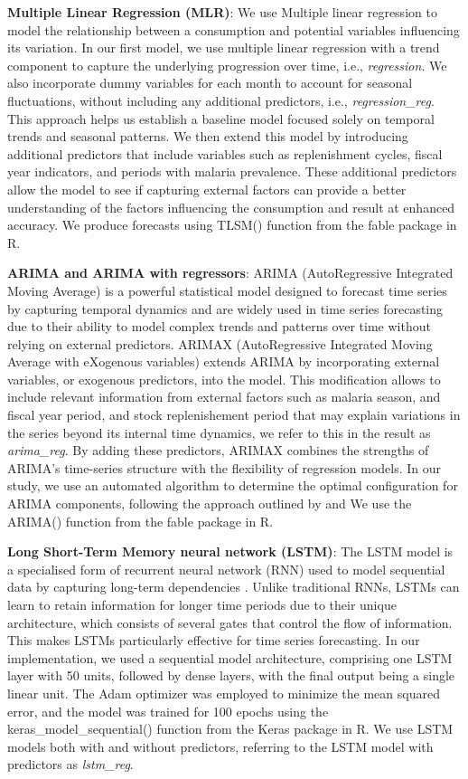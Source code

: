 \documentclass[
  authoryear,
  preprint,
  3p]{elsarticle}
\begin{document}
\textbf{Multiple Linear Regression (MLR)}: We use Multiple linear
regression to model the relationship between a consumption and potential
variables influencing its variation. In our first model, we use multiple
linear regression with a trend component to capture the underlying
progression over time, i.e., \emph{regression}. We also incorporate
dummy variables for each month to account for seasonal fluctuations,
without including any additional predictors, i.e.,
\emph{regression\_reg}. This approach helps us establish a baseline
model focused solely on temporal trends and seasonal patterns. We then
extend this model by introducing additional predictors that include
variables such as replenishment cycles, fiscal year indicators, and
periods with malaria prevalence. These additional predictors allow the
model to see if capturing external factors can provide a better
understanding of the factors influencing the consumption and result at
enhanced accuracy. We produce forecasts using TLSM() function from the
fable package in R.

\textbf{ARIMA and ARIMA with regressors}: ARIMA (AutoRegressive
Integrated Moving Average) is a powerful statistical model designed to
forecast time series by capturing temporal dynamics and are widely used
in time series forecasting due to their ability to model complex trends
and patterns over time without relying on external predictors. ARIMAX
(AutoRegressive Integrated Moving Average with eXogenous variables)
extends ARIMA by incorporating external variables, or exogenous
predictors, into the model. This modification allows to include relevant
information from external factors such as malaria season, and fiscal
year period, and stock replenishement period that may explain variations
in the series beyond its internal time dynamics, we refer to this in the
result as \emph{arima\_reg}. By adding these predictors, ARIMAX combines
the strengths of ARIMA's time-series structure with the flexibility of
regression models. In our study, we use an automated algorithm to
determine the optimal configuration for ARIMA components, following the
approach outlined by \citet{hyndman2021forecasting} and We use the
ARIMA() function from the fable package in R.

\textbf{Long Short-Term Memory neural network (LSTM)}: The LSTM model is
a specialised form of recurrent neural network (RNN) used to model
sequential data by capturing long-term dependencies
\citep{graves2012long}. Unlike traditional RNNs, LSTMs can learn to
retain information for longer time periods due to their unique
architecture, which consists of several gates that control the flow of
information. This makes LSTMs particularly effective for time series
forecasting. In our implementation, we used a sequential model
architecture, comprising one LSTM layer with 50 units, followed by dense
layers, with the final output being a single linear unit. The Adam
optimizer was employed to minimize the mean squared error, and the model
was trained for 100 epochs using the keras\_model\_sequential() function
from the Keras package in R. We use LSTM models both with and without
predictors, referring to the LSTM model with predictors as
\emph{lstm\_reg}.
\end{document}
